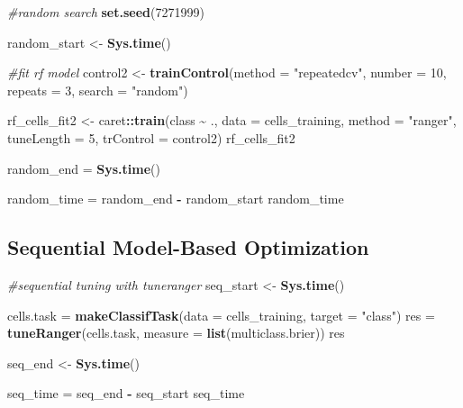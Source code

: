 \documentclass[12pt]{article}
\newenvironment{Shaded}{\begin{snugshade}}{\end{snugshade}}
\newcommand{\CommentTok}[1]{\textcolor[rgb]{0.56,0.35,0.01}{\textit{#1}}}
\newcommand{\DataTypeTok}[1]{\textcolor[rgb]{0.13,0.29,0.53}{#1}}
\newcommand{\DecValTok}[1]{\textcolor[rgb]{0.00,0.00,0.81}{#1}}
\newcommand{\KeywordTok}[1]{\textcolor[rgb]{0.13,0.29,0.53}{\textbf{#1}}}
\newcommand{\NormalTok}[1]{#1}
\newcommand{\OperatorTok}[1]{\textcolor[rgb]{0.81,0.36,0.00}{\textbf{#1}}}
\newcommand{\StringTok}[1]{\textcolor[rgb]{0.31,0.60,0.02}{#1}}
\begin{document}
\begin{Shaded}
\begin{Highlighting}[]
\CommentTok{\#random search}
\KeywordTok{set.seed}\NormalTok{(}\DecValTok{7271999}\NormalTok{)}

\NormalTok{random\_start <{-}}\StringTok{ }\KeywordTok{Sys.time}\NormalTok{()}

\CommentTok{\#fit rf model}
\NormalTok{control2 <{-}}\StringTok{ }\KeywordTok{trainControl}\NormalTok{(}\DataTypeTok{method =} \StringTok{"repeatedcv"}\NormalTok{, }
                         \DataTypeTok{number =} \DecValTok{10}\NormalTok{, }\DataTypeTok{repeats =} \DecValTok{3}\NormalTok{, }\DataTypeTok{search =} \StringTok{"random"}\NormalTok{)}

\NormalTok{rf\_cells\_fit2 <{-}}\StringTok{ }\NormalTok{caret}\OperatorTok{::}\KeywordTok{train}\NormalTok{(class }\OperatorTok{\textasciitilde{}}\StringTok{ }\NormalTok{.,}
                     \DataTypeTok{data =}\NormalTok{ cells\_training,}
                     \DataTypeTok{method =} \StringTok{"ranger"}\NormalTok{,}
                     \DataTypeTok{tuneLength =} \DecValTok{5}\NormalTok{,}
                     \DataTypeTok{trControl =}\NormalTok{ control2)}
\NormalTok{rf\_cells\_fit2}

\NormalTok{random\_end =}\StringTok{ }\KeywordTok{Sys.time}\NormalTok{()}

\NormalTok{random\_time =}\StringTok{ }\NormalTok{random\_end }\OperatorTok{{-}}\StringTok{ }\NormalTok{random\_start}
\NormalTok{random\_time}
\end{Highlighting}
\end{Shaded}

\hypertarget{sequential-model-based-optimization}{%
\subsection{Sequential Model-Based
Optimization}\label{sequential-model-based-optimization}}

\begin{Shaded}
\begin{Highlighting}[]
\CommentTok{\#sequential tuning with tuneranger}
\NormalTok{seq\_start <{-}}\StringTok{ }\KeywordTok{Sys.time}\NormalTok{()}

\NormalTok{cells.task =}\StringTok{ }\KeywordTok{makeClassifTask}\NormalTok{(}\DataTypeTok{data =}\NormalTok{ cells\_training, }\DataTypeTok{target =} \StringTok{"class"}\NormalTok{)}
\NormalTok{res =}\StringTok{ }\KeywordTok{tuneRanger}\NormalTok{(cells.task, }\DataTypeTok{measure =} \KeywordTok{list}\NormalTok{(multiclass.brier))}
\NormalTok{res}

\NormalTok{seq\_end <{-}}\StringTok{ }\KeywordTok{Sys.time}\NormalTok{()}

\NormalTok{seq\_time =}\StringTok{ }\NormalTok{seq\_end }\OperatorTok{{-}}\StringTok{ }\NormalTok{seq\_start}
\NormalTok{seq\_time}
\end{Highlighting}
\end{Shaded}
\end{document}
